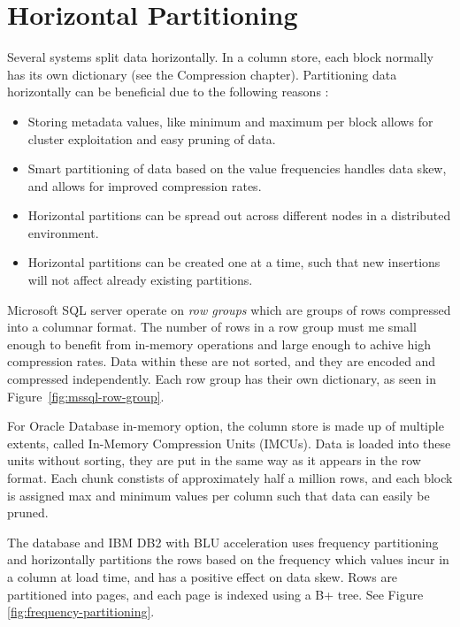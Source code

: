 \section{Horizontal Partitioning}
\label{sec:Horizontal Partitioning}
Several systems split data horizontally. In a column store, each block normally has its own dictionary (see the Compression chapter). Partitioning data horizontally can be beneficial due to the following reasons :
\begin{itemize}
  \item Storing metadata values, like minimum and maximum per block allows for cluster exploitation and easy pruning of data.
  \item Smart partitioning of data based on the value frequencies handles data skew, and allows for improved compression rates.
  \item Horizontal partitions can be spread out across different nodes in a distributed environment.
  \item Horizontal partitions can be created one at a time, such that new insertions will not affect already existing partitions.
\end{itemize}

Microsoft SQL server operate on \textit{row groups} which are groups of rows compressed into a columnar format. The number of rows in a row group must me small enough to benefit from in-memory operations and large enough to achive high compression rates. Data within these are not sorted, and they are encoded and compressed independently. Each row group has their own dictionary, as seen in Figure~\ref{fig:mssql-row-group}.

For Oracle Database in-memory option, the column store is made up of multiple extents, called In-Memory Compression Units (IMCUs). Data is loaded into these units without sorting, they are put in the same way as it appears in the row format. Each chunk constists of approximately half a million rows, and each block is assigned max and minimum values per column such that data can easily be pruned.

The  database and IBM DB2 with BLU acceleration  \cite{Barber2012-xt, Raman2013-em, Raman2008-gi} uses frequency partitioning and horizontally partitions the rows based on the frequency which values incur in a column at load time, and has a positive effect on data skew. Rows are partitioned into pages, and each page is indexed using a B+ tree. See Figure \ref{fig:frequency-partitioning}.

